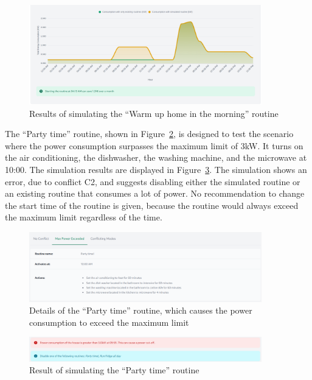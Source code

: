 \begin{figure}
    \centering
    \includegraphics[width=0.9\textwidth]{images/frontend/no_conflict_result.png}
    \caption{Results of simulating the ``Warm up home in the morning'' routine}%
    \label{fig:frontend_no_conflict_result}
\end{figure}

The ``Party time'' routine, shown in Figure~\ref{fig:frontend_max_power_exceeded}, is designed to test the scenario where the power consumption surpasses the maximum limit of 3kW. It turns on the air conditioning, the dishwasher, the washing machine, and the microwave at 10:00. The simulation results are displayed in Figure~\ref{fig:frontend_max_power_exceeded_result}. The simulation shows an error, due to conflict C2, and suggests disabling either the simulated routine or an existing routine that consumes a lot of power. No recommendation to change the start time of the routine is given, because the routine would always exceed the maximum limit regardless of the time.

\begin{figure}
    \centering
    \includegraphics[width=0.9\textwidth]{images/frontend/max_power_exceeded.png}
    \caption{Details of the ``Party time'' routine, which causes the power consumption to exceed the maximum limit}%
    \label{fig:frontend_max_power_exceeded}
\end{figure}

\begin{figure}
    \centering
    \includegraphics[width=0.9\textwidth]{images/frontend/max_power_exceeded_result.png}
    \caption{Result of simulating the ``Party time'' routine}%
    \label{fig:frontend_max_power_exceeded_result}
\end{figure}

